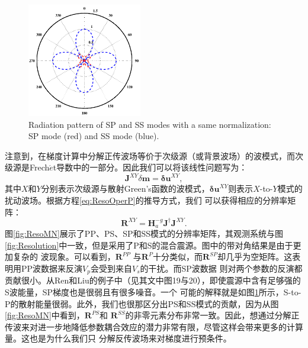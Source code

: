 \begin{figure}
    \begin{center}
        \includegraphics[width=5cm]{Figure/chapter02/radiationpattern/Fig/SPSS.pdf}
        \caption{
            Radiation pattern of SP and SS modes with a same normalization: SP
            mode (red) and SS mode (blue).
    }
    \label{fig:SPSS}
    \end{center}
\end{figure}


注意到，在梯度计算中分解正传波场等价于次级源（或背景波场）的波模式，而次级源是Frech{$\acute{e}$}t导数中的一部分。因此我们可以将该线性问题写为：
\begin{equation}
    \mathbf{J}^{XY}\delta\mathbf{m}=\mathbf{\delta u}^{XY},
    \label{eq:JXY}
\end{equation}
其中$X$和$Y$分别表示次级源与散射Green's函数的波模式，$\mathbf{\delta u}^{XY}$则表示${X}$-to-${Y}$模式的扰动波场。根据方程\eqref{eq:ResoOperP}的推导方式，我们
可以获得相应的分辨率矩阵：
\begin{equation}
    \mathbf{R}^{XY}=\mathbf{H}_a^{-g}\mathbf{J}^{\dagger}\mathbf{J}^{XY}. 
    \label{eq:RXY}  
\end{equation}
图\ref{fig:ResoMN}展示了PP、PS、SP和SS模式的分辨率矩阵，其观测系统与图\ref{fig:Resolution}中一致，但是采用了P和S的混合震源。图中的带对角结果是由于更加复杂的
波现象。可以看到，$\mathbf{R}^{PP}$ 与$\mathbf{R}^P$十分类似，而$\mathbf{R}^{SP}$却几乎为空矩阵。这表明用PP波数据来反演$V_p$会受到来自$V_s$的干扰。而SP波数据
则对两个参数的反演都贡献很小。从Ren和Liu\cite{ren.liu:2016}的例子中（见其文中图19与20），即使震源中含有足够强的S波能量，SP梯度也是很弱且有很多噪音。一个
可能的解释就是如图\ref{fig:SPSS}所示，S-to-P的散射能量很弱。此外，我们也很那区分出PS和SS模式的贡献，因为从图\ref{fig:ResoMN}中看到，$\mathbf{R}^{PS}$和
$\mathbf{R}^{SS}$的非零元素分布非常一致。因此，想通过分解正传波来对进一步地降低参数耦合效应的潜力非常有限，尽管这样会带来更多的计算量。这也是为什么我们只
分解反传波场来对梯度进行预条件。
